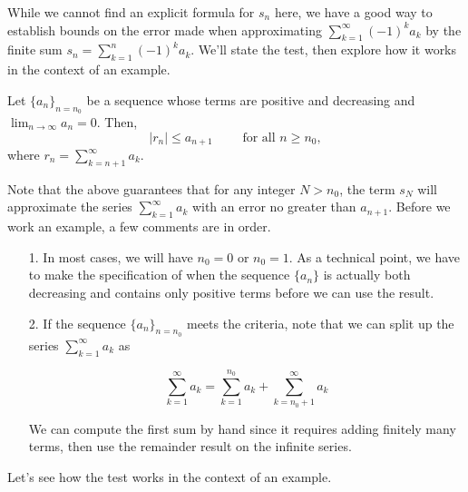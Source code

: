 \documentclass{ximera}
\begin{document}
While we cannot find an explicit formula for $s_n$ here, we have a good way to establish bounds on the error made when approximating $ \sum_{k=1}^{\infty} (-1)^k a_k$ by the finite sum $s_n= \sum_{k=1}^{n} (-1)^k a_k$.   We'll state the test, then explore how it works in the context of an example.

\begin{theorem}
Let $\{a_n\}_{n=n_0}$ be a sequence whose terms are positive and decreasing  and
$\lim_{n\to\infty}a_n=0$. Then,  
\[
\big| r_n \big| \leq a_{n+1} \qquad \textrm{ for all } n \geq n_0,
\]
where $r_n = \sum_{k=n+1}^{\infty} a_k$.
\end{theorem}

Note that the above guarantees that for any integer $N>n_0$, the term $s_N$ will approximate the series $\sum_{k=1}^{\infty} a_k$ with an error no greater than $a_{n+1}$.  Before we work an example, a few comments are in order.

\begin{itemize}
\item[1.] In most cases, we will have $n_0 = 0$ or $n_0 =1$.  As a technical point, we have to make the specification of when the sequence $\{a_n\}$ is actually both decreasing and contains only positive terms before we can use the result.  
\item[2.] If the sequence $\{a_n\}_{n = n_0}$ meets the criteria, note that we can split up the series $\sum_{k=1}^{\infty} a_k$ as 

\[ 
\sum_{k=1}^{\infty} a_k = \sum_{k=1}^{n_0} a_k +\sum_{k=n_0+1}^{\infty} a_k 
\]

We can compute the first sum by hand since it requires adding finitely many terms, then use the remainder result on the infinite series.
\end{itemize}

Let's see how the test works in the context of an example.
\end{document}
